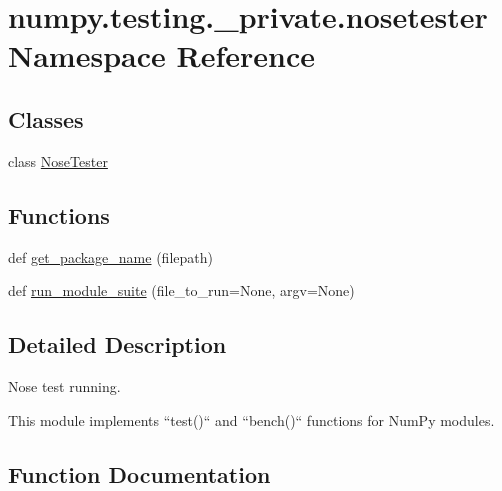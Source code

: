 \hypertarget{namespacenumpy_1_1testing_1_1__private_1_1nosetester}{}\section{numpy.\+testing.\+\_\+private.\+nosetester Namespace Reference}
\label{namespacenumpy_1_1testing_1_1__private_1_1nosetester}
\subsection*{Classes}
\begin{DoxyCompactItemize}
\item 
class \hyperlink{classnumpy_1_1testing_1_1__private_1_1nosetester_1_1NoseTester}{Nose\+Tester}
\end{DoxyCompactItemize}
\subsection*{Functions}
\begin{DoxyCompactItemize}
\item 
def \hyperlink{namespacenumpy_1_1testing_1_1__private_1_1nosetester_a565a910a8d59114ed60ff895749e2854}{get\+\_\+package\+\_\+name} (filepath)
\item 
def \hyperlink{namespacenumpy_1_1testing_1_1__private_1_1nosetester_ab2fa64ee08ede16c8dabb87785e8cc54}{run\+\_\+module\+\_\+suite} (file\+\_\+to\+\_\+run=None, argv=None)
\end{DoxyCompactItemize}


\subsection{Detailed Description}
\begin{DoxyVerb}Nose test running.

This module implements ``test()`` and ``bench()`` functions for NumPy modules.\end{DoxyVerb}
 

\subsection{Function Documentation}
\mbox{\label{namespacenumpy_1_1testing_1_1__private_1_1nosetester_a565a910a8d59114ed60ff895749e2854}} 
